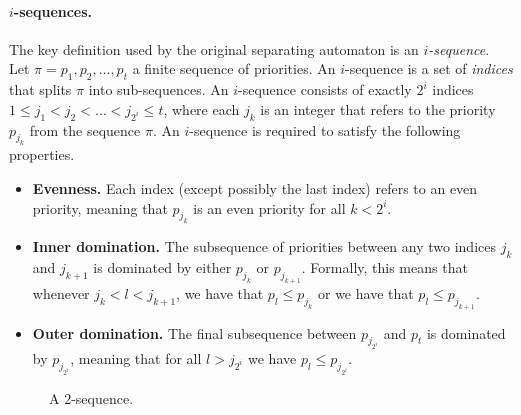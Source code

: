 \paragraph{\bf $i$-sequences.}
The key definition used by the original separating automaton is an
\emph{$i$-sequence}. Let $\pi = p_1, p_2, \dots, p_t$ a finite sequence of
priorities. An $i$-sequence is a set of \emph{indices} that splits $\pi$ into
sub-sequences. An $i$-sequence consists of exactly $2^i$ indices $1 \le j_1 <
j_2 < \dots < j_{2^i} \le t$, where each $j_k$ is an integer that refers to the
priority $p_{j_k}$ from the sequence $\pi$. An $i$-sequence is required to
satisfy the following properties. 
\begin{itemize} \item \textbf{Evenness.} Each
index (except possibly the last index) refers to an even priority, meaning that
$p_{j_k}$ is an even priority for all $k < 2^i$.

\item \textbf{Inner domination.} The subsequence of priorities between any two
indices $j_k$ and $j_{k+1}$ is dominated by either $p_{j_k}$ or $p_{j_{k+1}}$.
Formally, this means that whenever $j_k < l < j_{k+1}$, we have that $p_l \le
p_{j_k}$ or we have that $p_l \le p_{j_{k+1}}$.

\item \textbf{Outer domination.} The final subsequence between $p_{j_{2^i}}$ and
$p_t$ is dominated by $p_{j_{2^i}}$, meaning that for all $l > j_{2^i}$ we have
$p_l \le p_{j_{2^i}}$.
\end{itemize}

\begin{figure}[!ht]
    \begin{center}
    \end{center}
    \caption{A $2$-sequence.}
\label{3-fig:isequence}
\end{figure}


